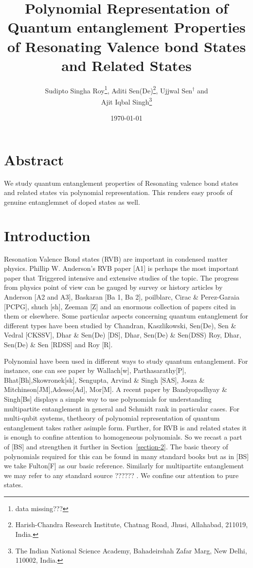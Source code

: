 \documentclass[a4paper,12pt]{article}
\theoremstyle{definition}
\theoremstyle{underlinethm}
\theoremstyle{underline}
\begin{document}
\title{Polynomial Representation of Quantum entanglement Properties of Resonating Valence bond States and Related States}
\author{Sudipto Singha Roy\footnote{data missing???}, Aditi Sen(De){\footnote{Harish-Chandra Research Institute, Chatnag Road, Jhusi, Allahabad, 211019, India.}}, Ujjwal Sen{$^\dagger$} and\\ Ajit Iqbal Singh{\footnote{The Indian National Science Academy, Bahadeirshah Zafar Marg, New Delhi, 110002, India.}}}

\date{\today}

\maketitle

\section*{Abstract}

We study quantum entanglement properties of Resonating valence bond states and related states via polynomial representation. This renders easy proofs of genuine entanglemnet of doped states as well.


\section{Introduction}\label{section-1}

Resonation Valence Bond states (RVB) are important in condensed matter physics. Phillip W. Anderson's RVB paper [A1] is perhaps the most important paper that Triggered intensive and extensive studies of the topic. The progress from physics point of view can be gauged by survey or history articles by Anderson [A2 and A3], Baskaran [Ba 1, Ba 2], poilblarc, Cirac \& Perez-Garaia [PCPG], shuch [sh], Zeeman [Z] and an enormous collection of papers cited in them or elsewhere. Some particular aspects concerning quantum entanglement for different types have been studied by Chandran, Kaszlikowski, Sen(De), Sen \& Vedral [CKSSV], Dhar \& Sen(De) [DS], Dhar, Sen(De) \& Sen(DSS) Roy, Dhar, Sen(De) \& Sen [RDSS] and Roy [R].


Polynomial have been used in different ways to study quantum entanglement. For instance, one can see paper by Wallach[w], Parthasarathy[P], Bhat[Bh],\break Skowronek[sk], Sengupta, Arvind \& Singh [SAS], Josza \& Mitchinson[JM],\break Adesso[Ad], Mor[M]. A recent paper by Bandyopadhyay \& Singh[Bs] displays a simple way to use polynomials for understanding multipartite entanglement in general and Schmidt rank in particular cases. For multi-qubit systems, the\break theory of polynomial representation of quantum entanglement takes rather a\break simple form. Further, for RVB is and related states it is enough to confine attention to homogeneous polynomials. So we recast a part of [BS] and strengthen it further in Section~\ref{section-2}. The basic theory of polynomials required for this can be found in many standard books but as in [BS] we take Fulton[F] as our basic reference. Similarly for multipartite  entanglement we may refer to any standard source  ?????? . We confine our attention to pure states.
\end{document}
